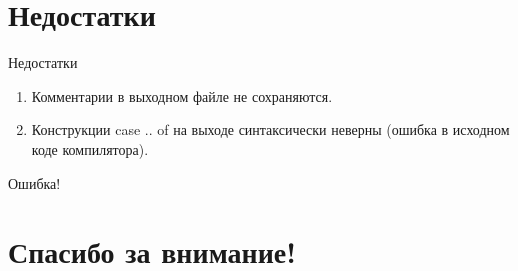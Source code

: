 \documentclass [12 pt ] {beamer}
\begin{document}
    \section{Недостатки}
    
    \begin{frame}{Недостатки}
        \begin{enumerate}
            \item Комментарии в выходном файле не сохраняются.
            \item Конструкции case ..  of на выходе синтаксически
                неверны (ошибка в исходном коде компилятора).
        \end{enumerate}
    \end{frame}
    
    \begin{frame}[containsverbatim]{Ошибка!}
        \begin{Parallel}{5cm}{5cm}
        \end{Parallel}
    \end{frame}
    
    \section{Спасибо за внимание!}
    
\end{document}
